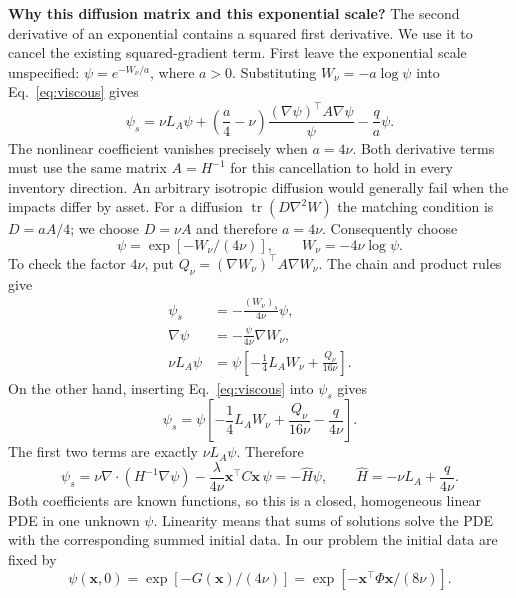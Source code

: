 \textbf{Why this diffusion matrix and this exponential scale?}
The second derivative of an exponential contains a squared first
derivative. We use it to cancel the existing squared-gradient term.
First leave the exponential scale unspecified: $\psi=e^{-W_\nu/a}$,
where $a>0$. Substituting $W_\nu=-a\log\psi$ into
Eq.~\eqref{eq:viscous} gives
\begin{equation}
 \psi_s=\nu L_A\psi+
 \left(\frac a4-\nu\right)
 \frac{(\nabla\psi)^\top A\nabla\psi}{\psi}
 -\frac q a\psi.
 \label{eq:stage4-scale-choice}
\end{equation}
The nonlinear coefficient vanishes precisely when $a=4\nu$.
Both derivative terms must use the same matrix $A=H^{-1}$ for this
cancellation to hold in every inventory direction. An arbitrary isotropic
diffusion would generally fail when the impacts differ by asset.
For a diffusion $\operatorname{tr}(D\nabla^2W)$ the matching condition
is $D=aA/4$; we choose $D=\nu A$ and therefore $a=4\nu$.
Consequently choose
\begin{equation}
 \psi=\exp[-W_\nu/(4\nu)],\qquad W_\nu=-4\nu\log\psi.
 \label{eq:stage4-transform}
\end{equation}
To check the factor $4\nu$, put
$Q_\nu=(\nabla W_\nu)^\top A\nabla W_\nu$. The chain and product rules give
\begin{align}
 \psi_s&=-\frac{(W_\nu)_s}{4\nu}\psi,\nonumber\\
 \nabla\psi&=-\frac{\psi}{4\nu}\nabla W_\nu,\nonumber\\
 \nu L_A\psi&=\psi\left[-\frac14L_AW_\nu
                              +\frac{Q_\nu}{16\nu}\right].
 \label{eq:stage4-chain}
\end{align}
On the other hand, inserting Eq.~\eqref{eq:viscous} into $\psi_s$ gives
\[
 \psi_s=\psi\left[-\frac14L_AW_\nu+
                         \frac{Q_\nu}{16\nu}-\frac{q}{4\nu}\right].
\]
The first two terms are exactly $\nu L_A\psi$. Therefore
\begin{equation}
 \boxed{\psi_s=\nu\nabla\!\cdot(H^{-1}\nabla\psi)
 -\frac{\lambda}{4\nu}\mathbf x^\top C\mathbf x\,\psi
 =-\hat H\psi,\qquad
 \hat H=-\nu L_A+\frac{q}{4\nu}.}
 \label{eq:linearised}
\end{equation}
Both coefficients are known functions, so this is a closed, homogeneous
linear PDE in one unknown $\psi$. Linearity means that sums of solutions
solve the PDE with the corresponding summed initial data. In our problem
the initial data are fixed by
\begin{equation}
 \psi(\mathbf x,0)=\exp[-G(\mathbf x)/(4\nu)]
 =\exp[-\mathbf x^\top\Phi\mathbf x/(8\nu)].
 \label{eq:stage4-initial}
\end{equation}
